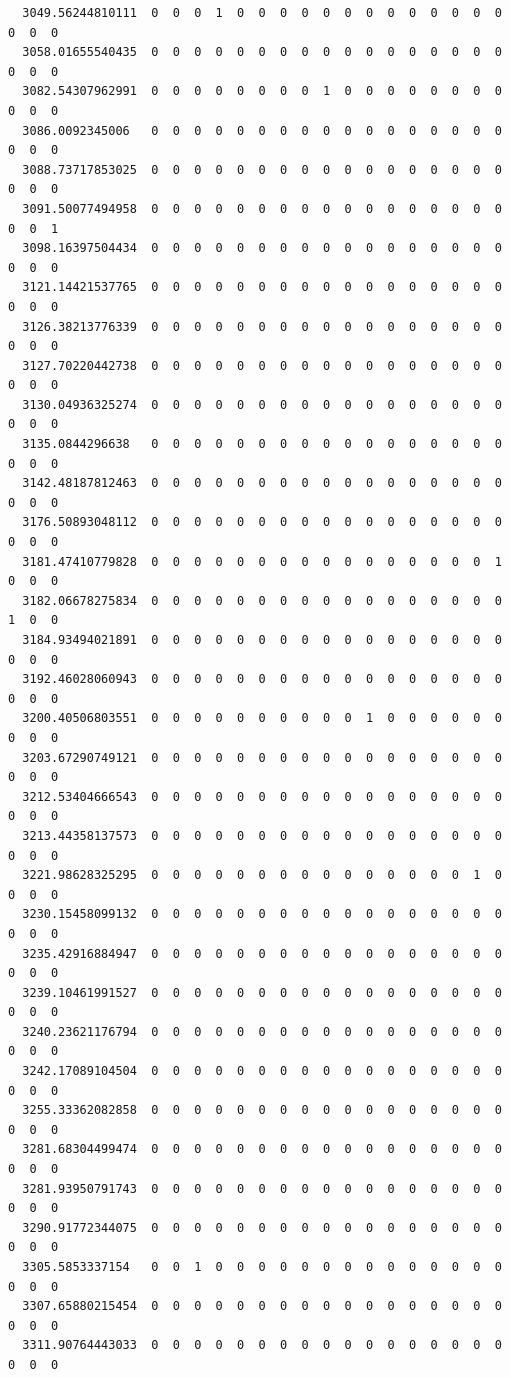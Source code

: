 \documentclass[
  letterpaper,
  DIV=11,
  numbers=noendperiod]{scrartcl}
\begin{document}
\begin{verbatim}
  3049.56244810111  0  0  0  1  0  0  0  0  0  0  0  0  0  0  0  0  0  0  0  0
  3058.01655540435  0  0  0  0  0  0  0  0  0  0  0  0  0  0  0  0  0  0  0  0
  3082.54307962991  0  0  0  0  0  0  0  0  1  0  0  0  0  0  0  0  0  0  0  0
  3086.0092345006   0  0  0  0  0  0  0  0  0  0  0  0  0  0  0  0  0  0  0  0
  3088.73717853025  0  0  0  0  0  0  0  0  0  0  0  0  0  0  0  0  0  0  0  0
  3091.50077494958  0  0  0  0  0  0  0  0  0  0  0  0  0  0  0  0  0  0  0  1
  3098.16397504434  0  0  0  0  0  0  0  0  0  0  0  0  0  0  0  0  0  0  0  0
  3121.14421537765  0  0  0  0  0  0  0  0  0  0  0  0  0  0  0  0  0  0  0  0
  3126.38213776339  0  0  0  0  0  0  0  0  0  0  0  0  0  0  0  0  0  0  0  0
  3127.70220442738  0  0  0  0  0  0  0  0  0  0  0  0  0  0  0  0  0  0  0  0
  3130.04936325274  0  0  0  0  0  0  0  0  0  0  0  0  0  0  0  0  0  0  0  0
  3135.0844296638   0  0  0  0  0  0  0  0  0  0  0  0  0  0  0  0  0  0  0  0
  3142.48187812463  0  0  0  0  0  0  0  0  0  0  0  0  0  0  0  0  0  0  0  0
  3176.50893048112  0  0  0  0  0  0  0  0  0  0  0  0  0  0  0  0  0  0  0  0
  3181.47410779828  0  0  0  0  0  0  0  0  0  0  0  0  0  0  0  0  1  0  0  0
  3182.06678275834  0  0  0  0  0  0  0  0  0  0  0  0  0  0  0  0  0  1  0  0
  3184.93494021891  0  0  0  0  0  0  0  0  0  0  0  0  0  0  0  0  0  0  0  0
  3192.46028060943  0  0  0  0  0  0  0  0  0  0  0  0  0  0  0  0  0  0  0  0
  3200.40506803551  0  0  0  0  0  0  0  0  0  0  1  0  0  0  0  0  0  0  0  0
  3203.67290749121  0  0  0  0  0  0  0  0  0  0  0  0  0  0  0  0  0  0  0  0
  3212.53404666543  0  0  0  0  0  0  0  0  0  0  0  0  0  0  0  0  0  0  0  0
  3213.44358137573  0  0  0  0  0  0  0  0  0  0  0  0  0  0  0  0  0  0  0  0
  3221.98628325295  0  0  0  0  0  0  0  0  0  0  0  0  0  0  0  1  0  0  0  0
  3230.15458099132  0  0  0  0  0  0  0  0  0  0  0  0  0  0  0  0  0  0  0  0
  3235.42916884947  0  0  0  0  0  0  0  0  0  0  0  0  0  0  0  0  0  0  0  0
  3239.10461991527  0  0  0  0  0  0  0  0  0  0  0  0  0  0  0  0  0  0  0  0
  3240.23621176794  0  0  0  0  0  0  0  0  0  0  0  0  0  0  0  0  0  0  0  0
  3242.17089104504  0  0  0  0  0  0  0  0  0  0  0  0  0  0  0  0  0  0  0  0
  3255.33362082858  0  0  0  0  0  0  0  0  0  0  0  0  0  0  0  0  0  0  0  0
  3281.68304499474  0  0  0  0  0  0  0  0  0  0  0  0  0  0  0  0  0  0  0  0
  3281.93950791743  0  0  0  0  0  0  0  0  0  0  0  0  0  0  0  0  0  0  0  0
  3290.91772344075  0  0  0  0  0  0  0  0  0  0  0  0  0  0  0  0  0  0  0  0
  3305.5853337154   0  0  1  0  0  0  0  0  0  0  0  0  0  0  0  0  0  0  0  0
  3307.65880215454  0  0  0  0  0  0  0  0  0  0  0  0  0  0  0  0  0  0  0  0
  3311.90764443033  0  0  0  0  0  0  0  0  0  0  0  0  0  0  0  0  0  0  0  0
                  

\end{verbatim}
\end{document}
